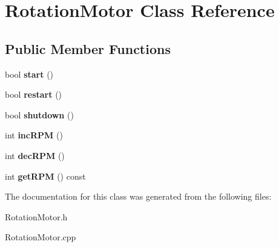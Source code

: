 \hypertarget{classRotationMotor}{}\section{Rotation\+Motor Class Reference}
\label{classRotationMotor}
\subsection*{Public Member Functions}
\begin{DoxyCompactItemize}
\item 
bool {\bfseries start} ()\hypertarget{classRotationMotor_a3a59b56b06b88eec34da2e6fb1bf79fd}{}\label{classRotationMotor_a3a59b56b06b88eec34da2e6fb1bf79fd}

\item 
bool {\bfseries restart} ()\hypertarget{classRotationMotor_af851728a596a7152b5043c1d8d7b9eba}{}\label{classRotationMotor_af851728a596a7152b5043c1d8d7b9eba}

\item 
bool {\bfseries shutdown} ()\hypertarget{classRotationMotor_aec67f5fd66b95f5fc42908e457c40d90}{}\label{classRotationMotor_aec67f5fd66b95f5fc42908e457c40d90}

\item 
int {\bfseries inc\+R\+PM} ()\hypertarget{classRotationMotor_afd61e66d58d4f1d1293844c797d9f3b9}{}\label{classRotationMotor_afd61e66d58d4f1d1293844c797d9f3b9}

\item 
int {\bfseries dec\+R\+PM} ()\hypertarget{classRotationMotor_a2616ef2fe5c136cabcfa89f58ff3b324}{}\label{classRotationMotor_a2616ef2fe5c136cabcfa89f58ff3b324}

\item 
int {\bfseries get\+R\+PM} () const \hypertarget{classRotationMotor_a1d2ef1d11a07b59ce591b3d3006976d5}{}\label{classRotationMotor_a1d2ef1d11a07b59ce591b3d3006976d5}

\end{DoxyCompactItemize}


The documentation for this class was generated from the following files\+:\begin{DoxyCompactItemize}
\item 
Rotation\+Motor.\+h\item 
Rotation\+Motor.\+cpp\end{DoxyCompactItemize}
